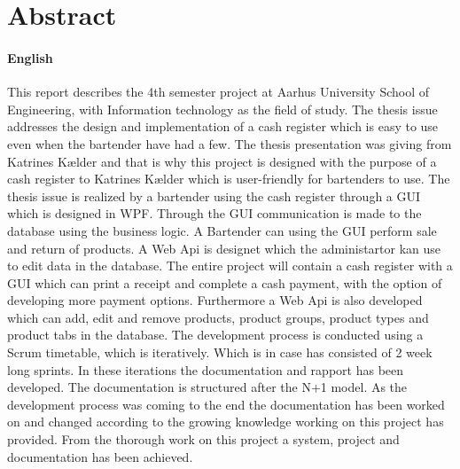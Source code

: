 \chapter{Abstract}

\subsubsection*{English}

This report describes the 4th semester project at Aarhus University School of Engineering, with Information technology as the field of study. The thesis issue addresses the design and implementation of a cash register which is easy to use even when the bartender have had a few. The thesis presentation was giving from Katrines Kælder and that is why this project is designed with the purpose of a cash register to Katrines Kælder which is user-friendly for bartenders to use.
\newline
\newline
The thesis issue is realized by a bartender using the cash register through a \gls{GUI} which is designed in \gls{WPF}. Through the \gls{GUI} communication is made to the database using the business logic. A Bartender can using the \gls{GUI} perform sale and return of products. A Web Api  is designet which the administartor kan use to edit data in the database.
\newline
\newline
The entire project will contain a cash register with a \gls{GUI} which can print a receipt and complete a cash payment, with the option of developing more payment options. Furthermore a Web Api  is also developed which can add, edit and remove products, product groups, product types and product tabs in the database.
\newline
\newline
The development process is conducted using a Scrum timetable, which is iteratively. Which is in case has consisted of 2 week long sprints. In these iterations the documentation and rapport has been developed. The documentation is structured after the N+1  model. As the development process was coming to the end the documentation has been worked on and changed according to the growing knowledge working on this project has provided. From the thorough work on this project a system, project and documentation has been achieved.